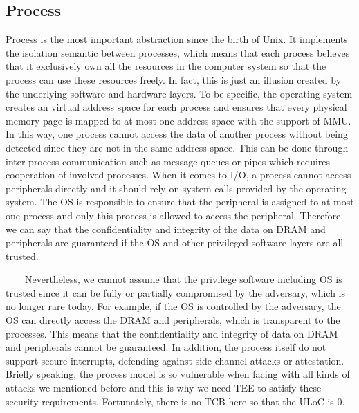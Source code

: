 \documentclass[12pt,twoside]{report}
\begin{document}
\subsection{Process}

Process is the most important abstraction since the birth of Unix. It implements the isolation semantic between processes, which means that each process believes that it exclusively own all the resources in the computer system so that the process can use these resources freely. In fact, this is just an illusion created by the underlying software and hardware layers. To be specific, the operating system creates an virtual address space for each process and ensures that every physical memory page is mapped to at most one address space with the support of MMU. In this way, one process cannot access the data of another process without being detected since they are not in the same address space. This can be done through inter-process communication such as message queues or pipes which requires cooperation of involved processes. When it comes to I/O, a process cannot access peripherals directly and it should rely on system calls provided by the operating system. The OS is responsible to ensure that the peripheral is assigned to at most one process and only this process is allowed to access the peripheral. Therefore, we can say that the confidentiality and integrity of the data on DRAM and peripherals are guaranteed if the OS and other privileged software layers are all trusted.

\ \ \ \ Nevertheless, we cannot assume that the privilege software including OS is trusted since it can be fully or partially compromised by the adversary, which is no longer rare today. For example, if the OS is controlled by the adversary, the OS can directly access the DRAM and peripherals, which is transparent to the processes. This means that the confidentiality and integrity of data on DRAM and peripherals cannot be guaranteed. In addition, the process itself do not support secure interrupts, defending against side-channel attacks or attestation. Briefly speaking, the process model is so vulnerable when facing with all kinds of attacks we mentioned before and this is why we need TEE to satisfy these security requirements. Fortunately, there is no TCB here so that the ULoC is 0.
\end{document}
